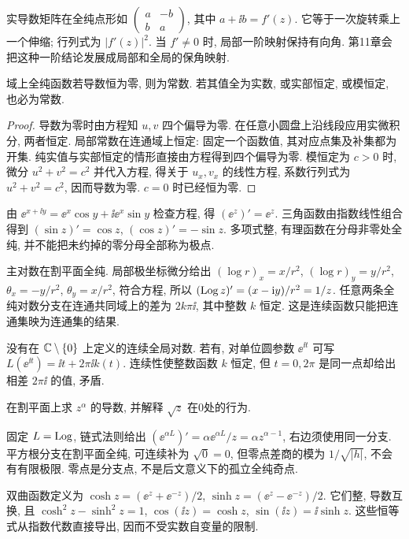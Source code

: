 实导数矩阵在全纯点形如 $\begin{pmatrix}a&-b\\b&a\end{pmatrix}$, 其中 $a+\ii b=f'(z)$. 它等于一次旋转乘上一个伸缩; 行列式为 $|f'(z)|^2$. 当 $f'\ne0$ 时, 局部一阶映射保持有向角. 第11章会把这种一阶结论发展成局部和全局的保角映射.
\begin{proposition}
域上全纯函数若导数恒为零, 则为常数. 若其值全为实数, 或实部恒定, 或模恒定, 也必为常数.
\end{proposition}
\begin{proof}
导数为零时由方程知 $u,v$ 四个偏导为零. 在任意小圆盘上沿线段应用实微积分, 两者恒定. 局部常数在连通域上恒定: 固定一个函数值, 其对应点集及补集都为开集. 纯实值与实部恒定的情形直接由方程得到四个偏导为零. 模恒定为 $c>0$ 时, 微分 $u^2+v^2=c^2$ 并代入方程, 得关于 $u_x,v_x$ 的线性方程, 系数行列式为 $u^2+v^2=c^2$, 因而导数为零. $c=0$ 时已经恒为零.
\end{proof}

由 $\ee^{x+\ii y}=\ee^x\cos y+\ii\ee^x\sin y$ 检查方程, 得 $(\ee^z)'=\ee^z$. 三角函数由指数线性组合得到 $(\sin z)'=\cos z$, $(\cos z)'=-\sin z$. 多项式整, 有理函数在分母非零处全纯, 并不能把未约掉的零分母全部称为极点.

主对数在割平面全纯. 局部极坐标微分给出 $(\log r)_x=x/r^2$, $(\log r)_y=y/r^2$, $\theta_x=-y/r^2$, $\theta_y=x/r^2$, 符合方程, 所以 $(\operatorname{Log} z)'=(x-\mathrm i y)/r^2=1/z$. 任意两条全纯对数分支在连通共同域上的差为 $2k\pi\ii$, 其中整数 $k$ 恒定. 这是连续函数只能把连通集映为连通集的结果.

没有在 $\mathbb C\setminus\{0\}$ 上定义的连续全局对数. 若有, 对单位圆参数 $\ee^{\ii t}$ 可写 $L(\ee^{\ii t})=\ii t+2\pi\ii k(t)$. 连续性使整数函数 $k$ 恒定, 但 $t=0,2\pi$ 是同一点却给出相差 $2\pi\ii$ 的值, 矛盾.
\begin{example}
在割平面上求 $z^\alpha$ 的导数, 并解释 $\sqrt z$ 在0处的行为.
\end{example}
\begin{solution}
固定 $L=\operatorname{Log}$, 链式法则给出 $(\ee^{\alpha L})'=\alpha\ee^{\alpha L}/z=\alpha z^{\alpha-1}$, 右边须使用同一分支. 平方根分支在割平面全纯, 可连续补为 $\sqrt0=0$, 但零点差商的模为 $1/\sqrt{|h|}$, 不会有有限极限. 零点是分支点, 不是后文意义下的孤立全纯奇点.
\end{solution}

双曲函数定义为 $\cosh z=(\ee^z+\ee^{-z})/2$, $\sinh z=(\ee^z-\ee^{-z})/2$. 它们整, 导数互换, 且 $\cosh^2z-\sinh^2z=1$, $\cos(\ii z)=\cosh z$, $\sin(\ii z)=\ii\sinh z$. 这些恒等式从指数代数直接导出, 因而不受实数自变量的限制.

